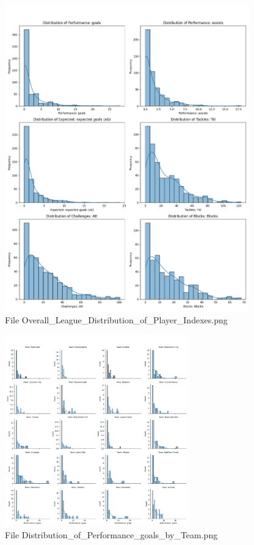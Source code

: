 \documentclass[12pt]{report}
\begin{document}
{\begin{figure}[h]
    \includegraphics[width=400px]{Overall_League_Distribution_of_Player_Indexes.png}
    \caption{File Overall\_League\_Distribution\_of\_Player\_Indexes.png}
    \label{fig:p1}
\end{figure}
\begin{figure}[h]
    \centering
    \includegraphics[width=300px]{Distribution_of_Performance_goals_by_Team.png}
    \caption{File Distribution\_of\_Performance\_goals\_by\_Team.png}
    \label{fig:p2}
\end{figure}
\begin{figure}[h]
    \centering

\end{figure}}
\end{document}
